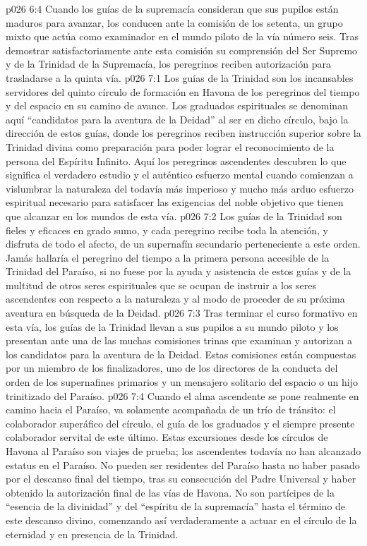 \vs p026 6:4 Cuando los guías de la supremacía consideran que sus pupilos están maduros para avanzar, los conducen ante la comisión de los setenta, un grupo mixto que actúa como examinador en el mundo piloto de la vía número seis. Tras demostrar satisfactoriamente ante esta comisión su comprensión del Ser Supremo y de la Trinidad de la Supremacía, los peregrinos reciben autorización para trasladarse a la quinta vía.
\vs p026 7:1 Los guías de la Trinidad son los incansables servidores del quinto círculo de formación en Havona de los peregrinos del tiempo y del espacio en su camino de avance. Los graduados espirituales se denominan aquí “candidatos para la aventura de la Deidad” al ser en dicho círculo, bajo la dirección de estos guías, donde los peregrinos reciben instrucción superior sobre la Trinidad divina como preparación para poder lograr el reconocimiento de la persona del Espíritu Infinito. Aquí los peregrinos ascendentes descubren lo que significa el verdadero estudio y el auténtico esfuerzo mental cuando comienzan a vislumbrar la naturaleza del todavía más imperioso y mucho más arduo esfuerzo espiritual necesario para satisfacer las exigencias del noble objetivo que tienen que alcanzar en los mundos de esta vía.
\vs p026 7:2 Los guías de la Trinidad son fieles y eficaces en grado sumo, y cada peregrino recibe toda la atención, y disfruta de todo el afecto, de un supernafín secundario perteneciente a este orden. Jamás hallaría el peregrino del tiempo a la primera persona accesible de la Trinidad del Paraíso, si no fuese por la ayuda y asistencia de estos guías y de la multitud de otros seres espirituales que se ocupan de instruir a los seres ascendentes con respecto a la naturaleza y al modo de proceder de su próxima aventura en búsqueda de la Deidad.
\vs p026 7:3 Tras terminar el curso formativo en esta vía, los guías de la Trinidad llevan a sus pupilos a su mundo piloto y los presentan ante una de las muchas comisiones trinas que examinan y autorizan a los candidatos para la aventura de la Deidad. Estas comisiones están compuestas por un miembro de los finalizadores, uno de los directores de la conducta del orden de los supernafines primarios y un mensajero solitario del espacio o un hijo trinitizado del Paraíso.
\vs p026 7:4 Cuando el alma ascendente se pone realmente en camino hacia el Paraíso, va solamente acompañada de un trío de tránsito: el colaborador superáfico del círculo, el guía de los graduados y el siempre presente colaborador servital de este último. Estas excursiones desde los círculos de Havona al Paraíso son viajes de prueba; los ascendentes todavía no han alcanzado estatus en el Paraíso. No pueden ser residentes del Paraíso hasta no haber pasado por el descanso final del tiempo, tras su consecución del Padre Universal y haber obtenido la autorización final de las vías de Havona. No son partícipes de la “esencia de la divinidad” y del “espíritu de la supremacía” hasta el término de este descanso divino, comenzando así verdaderamente a actuar en el círculo de la eternidad y en presencia de la Trinidad.
